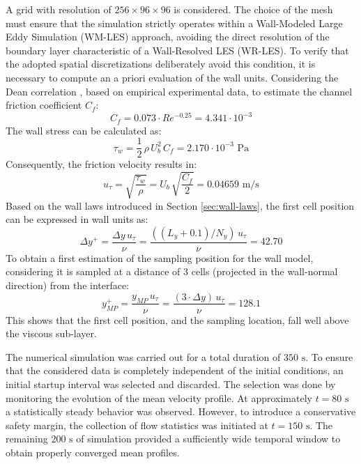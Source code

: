 \documentclass[12pt, a4paper, twoside, openright]{book}
\begin{document}
A grid with resolution of $256 \times 96 \times 96$ is considered. The choice of the mesh must ensure that the simulation strictly operates within a Wall-Modeled Large Eddy Simulation (WM-LES) approach, avoiding the direct resolution of the boundary layer characteristic of a Wall-Resolved LES (WR-LES). To verify that the adopted spatial discretizations deliberately avoid this condition, it is necessary to compute an a priori evaluation of the wall units. Considering the Dean correlation \cite{dean-correlation}, based on empirical experimental data, to estimate the channel friction coefficient $C_f$:
\begin{equation}
	C_f = 0.073 \cdot Re^{-0.25} = 4.341 \cdot 10^{-3}
	\label{eq:dean-correlation}
\end{equation}
The wall stress can be calculated as:
\begin{equation}
	\tau_w = \dfrac{1}{2} \, \rho \, U_b^2 \, C_f =  2.170 \cdot 10^{-3} \text{ Pa}
\end{equation}
Consequently, the friction velocity results in:
\begin{equation}
	u_\tau = \sqrt{\dfrac{\tau_w}{\rho}} = U_b \, \sqrt{\dfrac{C_f}{2}} = 0.04659 \text{ m/s}
\end{equation}
Based on the wall laws introduced in Section \ref{sec:wall-laws}, the first cell position can be expressed in wall units as:
\begin{equation}
	\Delta y^+ = \dfrac{\Delta y \, u_\tau}{\nu} = \dfrac{((L_y + 0.1)/N_y) \, u_\tau}{\nu} = 42.70
\end{equation}
To obtain a first estimation of the sampling position for the wall model, considering it is sampled at a distance of 3 cells (projected in the wall-normal direction) from the interface:
\begin{equation}
	y_{MP}^+ = \dfrac{y_{MP} \, u_\tau}{\nu} = \dfrac{(3 \cdot \Delta y) \, u_\tau}{\nu} = 128.1
\end{equation}
This shows that the first cell position, and the sampling location, fall well above the viscous sub-layer.

The numerical simulation was carried out for a total duration of $350 \text{ s}$. To ensure that the considered data is completely independent of the initial conditions, an initial startup interval was selected and discarded. The selection was done by monitoring the evolution of the mean velocity profile. At approximately $t = 80 \text{ s}$ a statistically steady behavior was observed. However, to introduce a conservative safety margin, the collection of flow statistics was initiated at $t = 150 \text{ s}$. The remaining $200 \text{ s}$ of simulation provided a sufficiently wide temporal window to obtain properly converged mean profiles.
\end{document}
